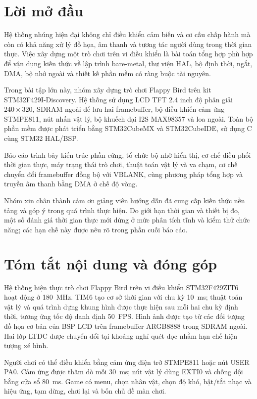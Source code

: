\chapter*{Lời mở đầu}

Hệ thống nhúng hiện đại không chỉ điều khiển cảm biến và cơ cấu chấp hành mà còn có khả năng xử lý đồ họa, âm thanh và tương tác người dùng trong thời gian thực. Việc xây dựng một trò chơi trên vi điều khiển là bài toán tổng hợp phù hợp để vận dụng kiến thức về lập trình bare-metal, thư viện HAL, bộ định thời, ngắt, DMA, bộ nhớ ngoài và thiết kế phần mềm có ràng buộc tài nguyên.

Trong bài tập lớn này, nhóm xây dựng trò chơi Flappy Bird trên kit STM32F429I-Discovery. Hệ thống sử dụng LCD TFT 2.4 inch độ phân giải $240\times320$, SDRAM ngoài để lưu hai framebuffer, bộ điều khiển cảm ứng STMPE811, nút nhấn vật lý, bộ khuếch đại I2S MAX98357 và loa ngoài. Toàn bộ phần mềm được phát triển bằng STM32CubeMX và STM32CubeIDE, sử dụng C cùng STM32 HAL/BSP.

Báo cáo trình bày kiến trúc phần cứng, tổ chức bộ nhớ hiển thị, cơ chế điều phối thời gian thực, máy trạng thái trò chơi, thuật toán vật lý và va chạm, cơ chế chuyển đổi framebuffer đồng bộ với VBLANK, cùng phương pháp tổng hợp và truyền âm thanh bằng DMA ở chế độ vòng.

Nhóm xin chân thành cảm ơn giảng viên hướng dẫn đã cung cấp kiến thức nền tảng và góp ý trong quá trình thực hiện. Do giới hạn thời gian và thiết bị đo, một số đánh giá thời gian thực mới dừng ở mức phân tích tĩnh và kiểm thử chức năng; các hạn chế này được nêu rõ trong phần cuối báo cáo.

\chapter*{Tóm tắt nội dung và đóng góp}

Hệ thống hiện thực trò chơi Flappy Bird trên vi điều khiển STM32F429ZIT6 hoạt động ở \SI{180}{\mega\hertz}. TIM6 tạo cơ sở thời gian với chu kỳ \SI{10}{\milli\second}; thuật toán vật lý và quá trình dựng khung hình được thực hiện sau mỗi hai chu kỳ định thời, tương ứng tốc độ danh định \SI{50}{FPS}. Hình ảnh được tạo từ các đối tượng đồ họa cơ bản của BSP LCD trên framebuffer ARGB8888 trong SDRAM ngoài. Hai lớp LTDC được chuyển đổi tại khoảng nghỉ quét dọc nhằm hạn chế hiện tượng xé hình.

Người chơi có thể điều khiển bằng cảm ứng điện trở STMPE811 hoặc nút USER PA0. Cảm ứng được thăm dò mỗi \SI{30}{\milli\second}; nút vật lý dùng EXTI0 và chống dội bằng cửa sổ \SI{80}{\milli\second}. Game có menu, chọn nhân vật, chọn độ khó, bật/tắt nhạc và hiệu ứng, tạm dừng, chơi lại và bốn chủ đề màn chơi.


